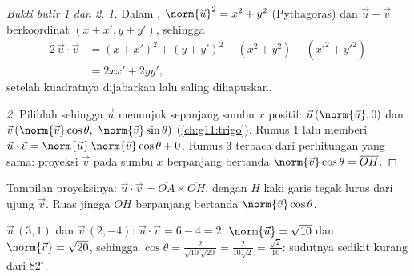 \begin{proof}[Bukti butir 1 dan 2]
\emph{1.} Dalam , $\norm{\vec u}^2 = x^2 + y^2$ (Pythagoras) dan
$\vec u + \vec v$ berkoordinat $(x + x', y + y')$, sehingga
\begin{align*}
2\,\vec u \cdot \vec v
&= (x + x')^2 + (y + y')^2 - (x^2 + y^2) - (x'^2 + y'^2)\\
&= 2xx' + 2yy',
\end{align*}
setelah kuadratnya dijabarkan lalu saling dihapuskan.

\emph{2.} Pilihlah  sehingga $\vec u$ menunjuk sepanjang
sumbu $x$ positif: $\vec u\,(\norm{\vec u}, 0)$ dan
$\vec v\,(\norm{\vec v}\cos\theta,\ \norm{\vec v}\sin\theta)$
(\cref{ch:g11:trigo}). Rumus 1 lalu memberi
$\vec u \cdot \vec v = \norm{\vec u}\,\norm{\vec v}\cos\theta + 0$.
Rumus 3 terbaca dari perhitungan yang sama: proyeksi $\vec v$ pada
sumbu $x$ berpanjang bertanda $\norm{\vec v}\cos\theta =
\overline{OH}$.
\end{proof}

\begin{omfigure}

{\small Tampilan proyeksinya: $\vec u \cdot \vec v = \overline{OA} \times
\overline{OH}$, dengan $H$ kaki garis tegak lurus dari ujung
$\vec v$. Ruas jingga $OH$ berpanjang bertanda
$\norm{\vec v}\cos\theta$.}
\end{omfigure}

\begin{example}\label{ex:g11:scal:compute}
$\vec u\,(3, 1)$ dan $\vec v\,(2, -4)$:
$\vec u \cdot \vec v = 6 - 4 = 2$. 
$\norm{\vec u} = \sqrt{10}$ dan $\norm{\vec v} = \sqrt{20}$, sehingga
$\cos\theta = \frac{2}{\sqrt{10}\sqrt{20}} = \frac{2}{10\sqrt2}
= \frac{\sqrt2}{10}$: sudutnya sedikit kurang dari $82^\circ$.
\end{example}

